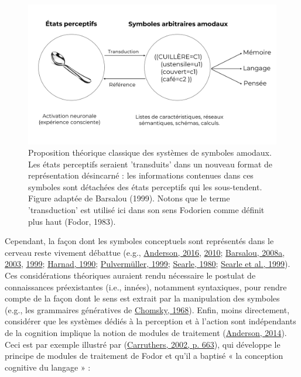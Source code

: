 \documentclass[
  a4paper,12pt,twoside,onecolumn,openright,final,oldfontcommands]{memoir}
\begin{document}
\begin{figure}[htbp!]

{\centering \includegraphics[width=1\linewidth]{figures/chap1-fig1} 

}

\caption{Proposition théorique classique des systèmes de symboles amodaux. Les états perceptifs seraient 'transduits' dans un nouveau format de représentation désincarné : les informations contenues dans ces symboles sont détachées des états perceptifs qui les sous-tendent. Figure adaptée de Barsalou (1999). Notons que le terme 'transduction' est utilisé ici dans son sens Fodorien comme définit plus haut (Fodor, 1983).}\label{fig:chap1-fig1}
\end{figure}

Cependant, la façon dont les symboles conceptuels sont représentés dans le cerveau reste vivement débattue (e.g., \protect\hyperlink{ref-anderson_neural_2016}{Anderson, 2016}, \protect\hyperlink{ref-anderson_neural_2010}{2010}; \protect\hyperlink{ref-barsalou_grounded_2008}{Barsalou, 2008a}, \protect\hyperlink{ref-barsalou_abstraction_2003}{2003}, \protect\hyperlink{ref-barsalou_perceptual_1999}{1999}; \protect\hyperlink{ref-harnad_symbol_1990}{Harnad, 1990}; \protect\hyperlink{ref-pulvermuller_words_1999}{Pulvermüller, 1999}; \protect\hyperlink{ref-searle_minds_1980}{Searle, 1980}; \protect\hyperlink{ref-searle_mystere_1999}{Searle et al., 1999}). Ces considérations théoriques auraient rendu nécessaire le postulat de connaissances préexistantes (i.e., innées), notamment syntaxiques, pour rendre compte de la façon dont le sens est extrait par la manipulation des symboles (e.g., les grammaires génératives de \protect\hyperlink{ref-chomsky_syntactic_1968}{Chomsky, 1968}). Enfin, moins directement, considérer que les systèmes dédiés à la perception et à l'action sont indépendants de la cognition implique la notion de modules de traitement (\protect\hyperlink{ref-anderson_after_2014}{Anderson, 2014}). Ceci est par exemple illustré par (\protect\hyperlink{ref-carruthers_cognitive_2002}{Carruthers, 2002, p. 663}), qui développe le principe de modules de traitement de Fodor et qu'il a baptisé « la conception cognitive du langage » :
\end{document}
